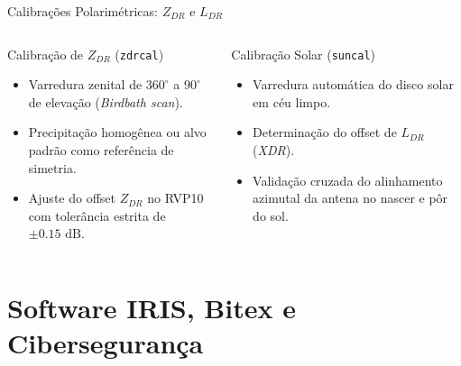 ﻿\documentclass[aspectratio=169]{beamer}
\begin{document}
\begin{frame}{Calibra{\c{c}}{\~o}es Polarim{\'e}tricas: $Z_{DR}$ e $L_{DR}$}
    \begin{columns}[T]
        \begin{column}{0.48\textwidth}
            \begin{block}{Calibra{\c{c}}{\~a}o de $Z_{DR}$ (\texttt{zdrcal})}
                \begin{itemize}
                    \item Varredura zenital de $360^\circ$ a $90^\circ$ de eleva{\c{c}}{\~a}o (\textit{Birdbath scan}).
                    \item Precipita{\c{c}}{\~a}o homog{\^e}nea ou alvo padr{\~a}o como refer{\^e}ncia de simetria.
                    \item Ajuste do offset $Z_{DR}$ no RVP10 com toler{\^a}ncia estrita de \textbf{$\pm 0.15\text{ dB}$}.
                \end{itemize}
            \end{block}
        \end{column}
        \begin{column}{0.48\textwidth}
            \begin{block}{Calibra{\c{c}}{\~a}o Solar (\texttt{suncal})}
                \begin{itemize}
                    \item Varredura autom{\'a}tica do disco solar em c{\'e}u limpo.
                    \item Determina{\c{c}}{\~a}o do offset de $L_{DR}$ (\textit{XDR}).
                    \item Valida{\c{c}}{\~a}o cruzada do alinhamento azimutal da antena no nascer e p{\^o}r do sol.
                \end{itemize}
            \end{block}
        \end{column}
    \end{columns}
\end{frame}

\section{Software IRIS, Bitex e Ciberseguran{\c{c}}a}
\end{document}
